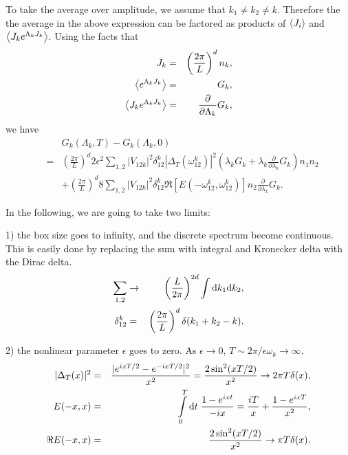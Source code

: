 To take the average over amplitude, we assume that $k_1\neq k_2\neq k$.
Therefore the the average in the above expression can be factored as products of $\left< J_i\right>$ and $\left< J_k e^{\Lambda_k J_k}\right>$.
Using the facts that
\begin{eqnarray}
	J_k &=& \left(\frac{2\pi}{L}\right)^d n_k,\nonumber\\
	\left< e^{\Lambda_k J_k}\right> &=& G_k,\nonumber\\
	\left< J_k e^{\Lambda_k J_k}\right> &=& \frac{\partial}{\partial \Lambda_k} G_k,
\end{eqnarray}
we have
\begin{eqnarray}
	&& G_k(\Lambda_k,T)-G_k(\Lambda_k,0) \nonumber\\
	&=&\left(\frac{2\pi}{L}\right)^d 2\epsilon^2 \sum\limits_{1,2}|V_{12k}|^2 \delta_{12}^k|\Delta_T(\omega_{12}^{k})|^2 \left( \lambda_k G_k+\lambda_k \frac{\partial}{\partial \lambda_k}G_k\right) n_1 n_2\nonumber\\
	&&+\left(\frac{2\pi}{L}\right)^d 8\sum\limits_{1,2}|V_{12k}|^2 \delta_{12}^k \Re\left[E(-\omega_{12}^k,\omega_{12}^k)\right] n_2\frac{\partial}{\partial \lambda_k}G_k.
\end{eqnarray}

In the following, we are going to take two limits: 

1) the box size goes to infinity, and the discrete spectrum become continuous.
This is easily done by replacing the sum with integral and Kronecker delta with the Dirac delta.
\begin{eqnarray}
	\sum\limits_{1,2}&\rightarrow & \left(\frac{L}{2\pi}\right) ^{2d}\int\mathrm{d} k_1\mathrm{d} k_2, \nonumber\\
	\delta_{12}^k &= & \left(\frac{2\pi}{L}\right) ^{d}\delta(k_1+k_2-k).
\end{eqnarray}

2) the nonlinear parameter $\epsilon$ goes to zero.
As $\epsilon\rightarrow 0$, $T\sim 2\pi/\epsilon\omega_k\rightarrow\infty$. 
\begin{eqnarray}
	|\Delta_T(x)|^2 &=& \frac{|e^{ixT/2}-e^{-ixT/2}|^2}{x^2} = \frac{2\sin^2(xT/2)}{x^2}\rightarrow 2\pi T\delta(x),\\
	E(-x,x) &=& \int\limits_0^T \mathrm{d} t\;\frac{1-e^{ixt}}{-ix} = \frac{iT}{x}+\frac{1-e^{ixT}}{x^2},\\
	\Re E(-x,x) &=&\frac{2\sin^2(xT/2)}{x^2}\rightarrow \pi T \delta(x).
\end{eqnarray}

